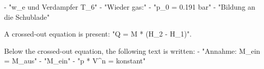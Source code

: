 - "w_e und Verdampfer T_6"
- "Wieder gas:"
- "p_0 = 0.191 bar"
- "Bildung an die Schublade"

A crossed-out equation is present: "Q = M * (H_2 - H_1)".

Below the crossed-out equation, the following text is written:
- "Annahme: M_ein = M_aus"
- "M_ein"
- "p * V^n = konstant"